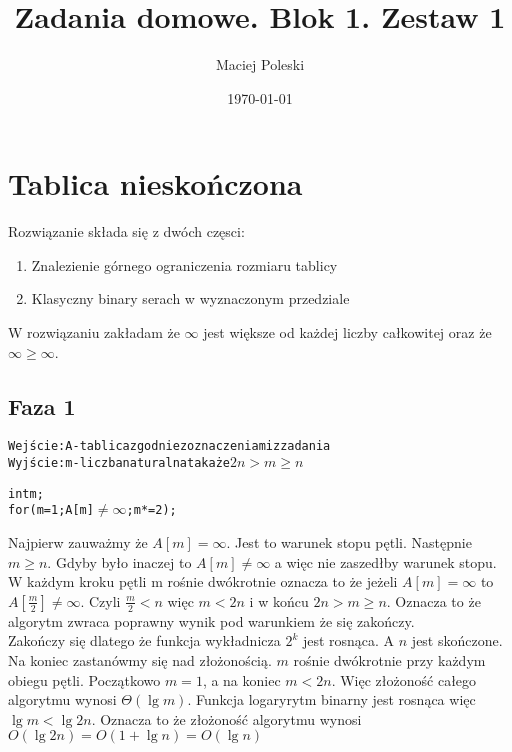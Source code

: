 \documentclass[a4paper,12pt]{article}
\title{Zadania domowe. Blok 1. Zestaw 1}
\author{Maciej Poleski}
\date{\today}
\begin{document}
\maketitle

\newpage

\section{Tablica nieskończona}
Rozwiązanie składa się z dwóch częsci:
\begin{enumerate}
 \item Znalezienie górnego ograniczenia rozmiaru tablicy
 \item Klasyczny binary serach w wyznaczonym przedziale
\end{enumerate}
W rozwiązaniu zakładam że $\infty$ jest większe od każdej liczby całkowitej oraz że $\infty\geq{\infty}$.
\subsection*{Faza 1}
\begin{alltt}
 Wejście: A - tablica zgodnie z oznaczeniami z zadania
 Wyjście: m - liczba naturalna taka że \(2n>m\geq{n}\)
 
 int m;
 for(m=1 ; A[m]\(\neq\infty\) ; m*=2);
\end{alltt} 
Najpierw zauważmy że $A[m]=\infty$. Jest to warunek stopu pętli.
Następnie $m\geq{n}$. Gdyby było inaczej to $A[m]\neq\infty$ a więc nie zaszedłby warunek stopu.
W każdym kroku pętli m rośnie dwókrotnie oznacza to że jeżeli $A[m]=\infty$ to $A[\frac{m}{2}]\neq\infty$. Czyli $\frac{m}{2}<n$ więc $m<2n$ i w końcu $2n>m\geq{n}$. Oznacza to że algorytm zwraca poprawny wynik pod warunkiem że się zakończy.\\
Zakończy się dlatego że funkcja wykładnicza $2^k$ jest rosnąca. A $n$ jest skończone.\\
Na koniec zastanówmy się nad złożonością. $m$ rośnie dwókrotnie przy każdym obiegu pętli. Początkowo $m=1$, a na koniec $m<2n$. Więc złożoność całego algorytmu wynosi $\varTheta(\lg{m})$.
Funkcja logaryrytm binarny jest rosnąca więc $\lg{m}<\lg{2n}$. Oznacza to że złożoność algorytmu wynosi $O(\lg{2n}) = O(1+\lg{n}) = O(\lg{n})$
\end{document}
